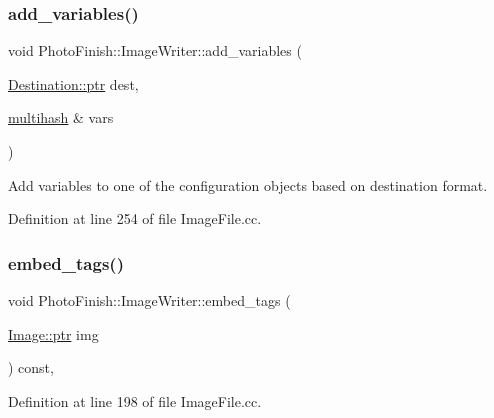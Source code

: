 \subsubsection{\texorpdfstring{add\+\_\+variables()}{add\_variables()}}
{\footnotesize\ttfamily void Photo\+Finish\+::\+Image\+Writer\+::add\+\_\+variables (\begin{DoxyParamCaption}\item[{\hyperlink{class_photo_finish_1_1_destination_a0d282a905cd81c3f0e6d7233c9bc7774}{Destination\+::ptr}}]{dest,  }\item[{\hyperlink{namespace_photo_finish_a6f41796f162687538b7da5c7a95e2d18}{multihash} \&}]{vars }\end{DoxyParamCaption})\hspace{0.3cm}{\ttfamily [static]}}



Add variables to one of the configuration objects based on destination format. 



Definition at line 254 of file Image\+File.\+cc.

\mbox{\label{class_photo_finish_1_1_image_writer_ab53f665863c877fc5066eb3227a06294}} 
\subsubsection{\texorpdfstring{embed\+\_\+tags()}{embed\_tags()}}
{\footnotesize\ttfamily void Photo\+Finish\+::\+Image\+Writer\+::embed\+\_\+tags (\begin{DoxyParamCaption}\item[{\hyperlink{class_photo_finish_1_1_image_ab336203305ed3a1397d7245063353b5a}{Image\+::ptr}}]{img }\end{DoxyParamCaption}) const\hspace{0.3cm}{\ttfamily [protected]}, {\ttfamily [virtual]}}



Definition at line 198 of file Image\+File.\+cc.

\mbox{\label{class_photo_finish_1_1_image_writer_acc62967632f4e78f2c356842fbd3edb4}} 

